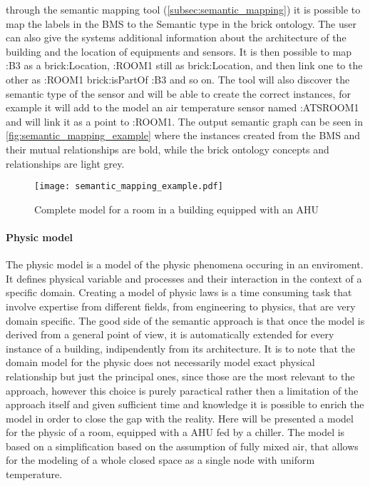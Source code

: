 through the semantic mapping tool (\ref{subsec:semantic_mapping}) it is possible to map the labels in the BMS to the Semantic type in the brick ontology. The user can also give the systems additional information about the architecture of the building and the location of equipments and sensors. It is then possible to map :B3 as a brick:Location, :ROOM1 still as brick:Location, and then link one to the other as :ROOM1 brick:isPartOf :B3 and so on. The tool will also discover the semantic type of the sensor and will be able to create the correct instances, for example it will add to the model an air temperature sensor named :ATSROOM1 and will link it as a point to :ROOM1. The output semantic graph can be seen in \autoref{fig:semantic_mapping_example} where the instances created from the BMS and their mutual relationships are bold, while the brick ontology concepts and relationships are light grey.

\begin{figure}
  \texttt{[image: semantic\_mapping\_example.pdf]}
  \caption{Complete model for a room in a building equipped with an AHU}
  \label{fig:semantic_mapping_example}
\end{figure}

\paragraph{Physic model}
The physic model is a model of the physic phenomena occuring in an enviroment. It defines physical variable and processes and their interaction in the context of a specific domain. Creating a model of physic laws is a time consuming task that involve expertise from different fields, from engineering to physics, that are very domain specific. The good side of the semantic approach is that once the model is derived from a general point of view, it is automatically extended for every instance of a building, indipendently from its architecture. It is to note that the domain model for the physic does not necessarily model exact physical relationship but just the principal ones, since those are the most relevant to the approach, however this choice is purely paractical rather then a limitation of the approach itself and given sufficient time and knowledge it is possible to enrich the model in order to close the gap with the reality. Here will be presented a model for the physic of a room, equipped with a AHU fed by a chiller. The model is based on a simplification based on the assumption of fully mixed air, that allows for the modeling of a whole closed space as a single node with uniform temperature. 
